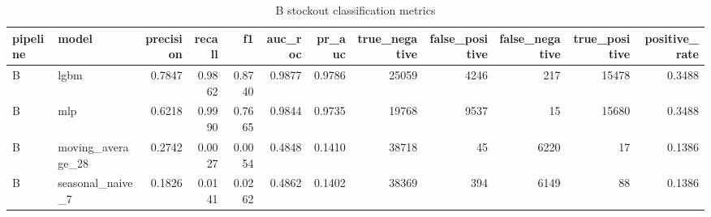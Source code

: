 \begin{table}
\caption{B stockout classification metrics}
\label{tab:classification-B}
\begin{tabular}{llrrrrrrrrrr}
\toprule
pipeline & model & precision & recall & f1 & auc\_roc & pr\_auc & true\_negative & false\_positive & false\_negative & true\_positive & positive\_rate \\
\midrule
B & lgbm & 0.7847 & 0.9862 & 0.8740 & 0.9877 & 0.9786 & 25059 & 4246 & 217 & 15478 & 0.3488 \\
B & mlp & 0.6218 & 0.9990 & 0.7665 & 0.9844 & 0.9735 & 19768 & 9537 & 15 & 15680 & 0.3488 \\
B & moving\_average\_28 & 0.2742 & 0.0027 & 0.0054 & 0.4848 & 0.1410 & 38718 & 45 & 6220 & 17 & 0.1386 \\
B & seasonal\_naive\_7 & 0.1826 & 0.0141 & 0.0262 & 0.4862 & 0.1402 & 38369 & 394 & 6149 & 88 & 0.1386 \\
\bottomrule
\end{tabular}
\end{table}
